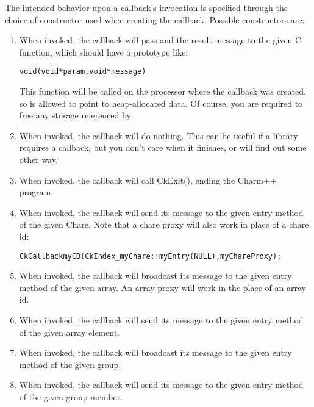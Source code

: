 The intended behavior upon a callback's invocation is specified
through the choice of constructor used when creating the callback. 
Possible constructors are: 

\begin{enumerate}
\item {} 
When invoked, the callback will pass  and the result message
to the given C function, which should have a prototype
like:

\begin{alltt}
void (void *param,void *message)
\end{alltt}

This function will be called on the processor where the callback was created,
so  is allowed to point to heap-allocated data.  Of course, you
are required to free any storage referenced by .

\item {} When invoked, the callback
will do nothing.  This can be useful if a \charmpp{} library requires
a callback, but you don't care when it finishes, or will find out some
other way.

\item {} When invoked, the callback
will call CkExit(), ending the Charm++ program.

\item {} When invoked, the 
callback will send its message to the given entry method of the given
Chare.  Note that a chare proxy will also work in place of a chare id:

\begin{alltt}
	CkCallback myCB(CkIndex_myChare::myEntry(NULL),myChareProxy);
\end{alltt}

\item {} 
When invoked,
the callback will broadcast its message to the given entry method
of the given array.  An array proxy will work in the place of an array id.

\item {}
When invoked,
the callback will send its message to the given entry method
of the given array element. 

\item {} 
When invoked,
the callback will broadcast its message to the given entry method
of the given group.

\item {}
When invoked, the callback will send its message to the given entry
method of the given group member.

\end{enumerate}


